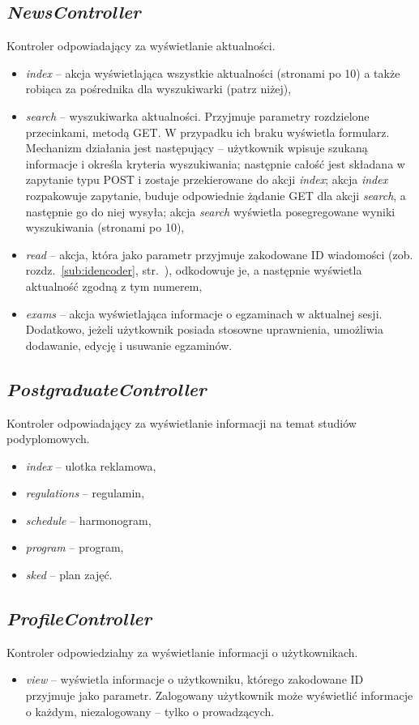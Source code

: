 \documentclass[a4paper,12pt,oneside]{report}
\begin{document}
\subsection{\emph{NewsController}}
\label{con:news}
  Kontroler odpowiadający za wyświetlanie aktualności.
\begin{itemize}
  \item \emph{index} -- akcja wyświetlająca wszystkie aktualności (stronami po 10) a także robiąca za pośrednika dla wyszukiwarki (patrz niżej),
  \item \emph{search} -- wyszukiwarka aktualności. Przyjmuje parametry rozdzielone przecinkami, metodą GET. W przypadku ich braku wyświetla formularz. Mechanizm działania jest następujący -- użytkownik wpisuje szukaną informacje i określa kryteria wyszukiwania; następnie całość jest składana w zapytanie typu POST i zostaje przekierowane do akcji \emph{index}; akcja \emph{index} rozpakowuje zapytanie, buduje odpowiednie żądanie GET dla akcji \emph{search}, a następnie go do niej wysyła; akcja \emph{search} wyświetla posegregowane wyniki wyszukiwania (stronami po 10),
  \item \emph{read} -- akcja, która jako parametr przyjmuje zakodowane ID wiadomości (zob. rozdz.~\ref{sub:idencoder}, str.~\pageref{sub:idencoder}), odkodowuje je, a następnie wyświetla aktualność zgodną z tym numerem,
  \item \emph{exams} -- akcja wyświetlająca informacje o egzaminach w aktualnej sesji. Dodatkowo, jeżeli użytkownik posiada stosowne uprawnienia, umożliwia dodawanie, edycję i usuwanie egzaminów. 
\end{itemize}

\subsection{\emph{PostgraduateController}}
\label{con:postgraduate}
  Kontroler odpowiadający za wyświetlanie informacji na temat studiów podyplomowych.
\begin{itemize}
  \item \emph{index} -- ulotka reklamowa,
  \item \emph{regulations} -- regulamin,
  \item \emph{schedule} -- harmonogram,
  \item \emph{program} -- program,
  \item \emph{sked} -- plan zajęć.
\end{itemize}

\subsection{\emph{ProfileController}}
\label{con:profile}
  Kontroler odpowiedzialny za wyświetlanie informacji o użytkownikach.
\begin{itemize}
  \item \emph{view} -- wyświetla informacje o użytkowniku, którego zakodowane ID przyjmuje jako parametr. Zalogowany użytkownik może wyświetlić informacje o każdym, niezalogowany -- tylko o prowadzących.
\end{itemize}
\end{document}
